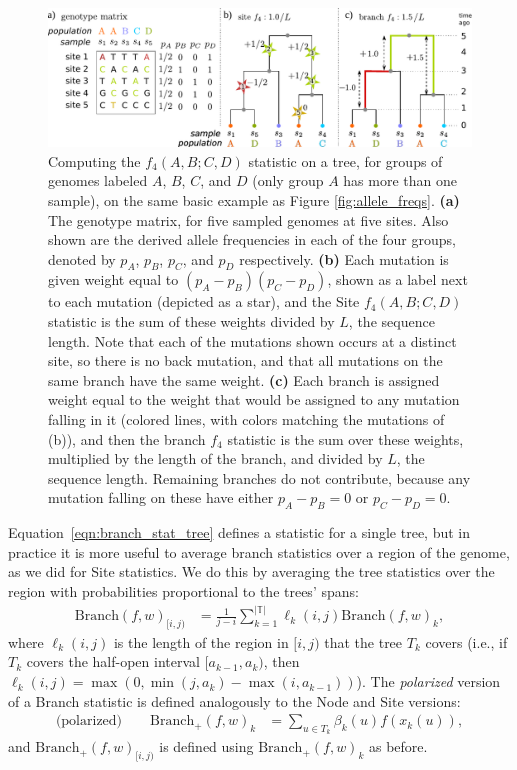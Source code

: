 \documentclass[9pt,twoside,lineno]{gsajnl}
\newcommand{\branch}{\mbox{Branch}} %
\newcommand{\branchp}{\mbox{Branch}_+} %
\newcommand{\treeseq}{\mathbb{T}} %
\newcommand{\iw}{w} %
\newcommand{\nw}{x} %
\begin{document}
\begin{figure}
    \centering
    \includegraphics[width=\textwidth]{figures/branch_site_diagram}
    \caption{
    Computing the $f_4(A,B;C,D)$ statistic on a tree,
    for groups of genomes labeled $A$, $B$, $C$, and $D$
    (only group $A$ has more than one sample),
    on the same basic example as Figure \ref{fig:allele_freqs}.
    \textbf{(a)} The genotype matrix, for five sampled genomes at five sites.
    Also shown are the derived allele frequencies in each of the four groups,
    denoted by $p_A$, $p_B$, $p_C$, and $p_D$ respectively.
    \textbf{(b)} Each mutation is given weight equal to $(p_A - p_B)(p_C - p_D)$,
    shown as a label next to each mutation (depicted as a star),
    and the Site $f_4(A,B;C,D)$ statistic is the sum of these weights
    divided by $L$, the sequence length.
    Note that each of the mutations shown occurs at a distinct site, so there is no back mutation,
    and that all mutations on the same branch have the same weight.
    \textbf{(c)} Each branch is assigned weight equal to the weight that would be assigned
    to any mutation falling in it (colored lines, with colors matching the mutations of (b)),
    and then the branch $f_4$ statistic
    is the sum over these weights, multiplied by the length of the branch,
    and divided by $L$, the sequence length.
    Remaining branches do not contribute,
    because any mutation falling on these have either $p_A - p_B = 0$ or $p_C - p_D = 0$.
        \label{fig:branch_site_diagram}
    }
\end{figure}

Equation~\eqref{eqn:branch_stat_tree} defines a statistic for a single tree,
but in practice it is more useful to average branch statistics
over a region of the genome, as we did for Site statistics.
We do this by averaging the tree statistics over the region
with probabilities proportional to the trees' spans:
\begin{align}
    \branch(f, \iw)_{[i,j)}
    &=
    \frac{1}{j-i} \sum_{k=1}^{|\treeseq|} \ell_k(i,j) \branch(f, \iw)_{k} ,
\end{align}
where $\ell_k(i,j)$ is the length of the region in $[i,j)$ that the tree $T_k$ covers
(i.e., if $T_k$ covers the half-open interval $[a_{k-1},a_k)$,
then $\ell_k(i,j) = \max(0, \min(j,a_k) - \max(i,a_{k-1}))$).
The \emph{polarized} version of a Branch statistic
is defined analogously to the Node and Site versions:
\begin{align} \label{eqn:branch_polarised}
    \text{(polarized)} \qquad
    \branchp(f, \iw)_k
    &=
    \sum_{u \in T_k} \beta_{k}(u) f(\nw_{k}(u)) ,
\end{align}
and $\branchp(f, \iw)_{[i,j)}$ is defined using $\branchp(f, \iw)_k$ as before.
\end{document}
